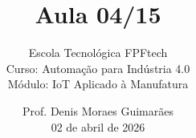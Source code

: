 \title{Aula 04/15}

\subtitle{
\vspace{1.0cm}
Escola Tecnológica FPFtech\\
\vspace{0.5cm}
Curso: Automação para Indústria 4.0\\
\vspace{0.5cm}
Módulo: IoT Aplicado à Manufatura
\vspace{1.0cm}
}

\author{
Prof. Denis Moraes Guimarães\\
\small 02 de abril de 2026
}

\date{}